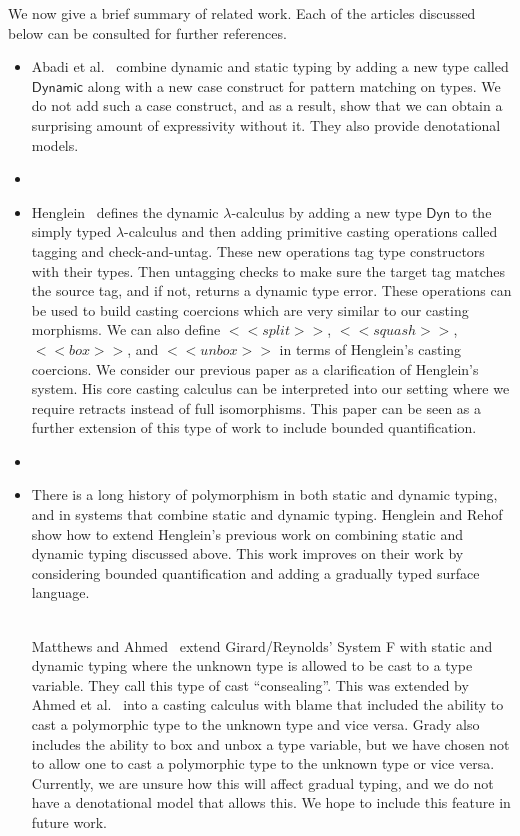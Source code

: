 We now give a brief summary of related work. Each of the articles
discussed below can be consulted for further references.
\begin{itemize}
\item Abadi et al.~\cite{Abadi:1989} combine dynamic and static typing
  by adding a new type called $\mathsf{Dynamic}$ along with a new case
  construct for pattern matching on types.  We do not add such a case
  construct, and as a result, show that we can obtain a surprising
  amount of expressivity without it.  They also provide denotational
  models.
\item[]
\item Henglein~\cite{Henglein:1994} defines the dynamic
  $\lambda$-calculus by adding a new type $\mathsf{Dyn}$ to the simply
  typed $\lambda$-calculus and then adding primitive casting
  operations called tagging and check-and-untag.  These new operations
  tag type constructors with their types.  Then untagging checks to
  make sure the target tag matches the source tag, and if not, returns
  a dynamic type error.  These operations can be used to build casting
  coercions which are very similar to our casting morphisms. We can
  also define $<<split>>$, $<<squash>>$, $<<box>>$, and $<<unbox>>$ in
  terms of Henglein's casting coercions.  We consider our previous
  paper \cite{Eades:2017} as a clarification of Henglein's system.
  His core casting calculus can be interpreted into our setting where
  we require retracts instead of full isomorphisms.  This paper can be
  seen as a further extension of this type of work to include bounded
  quantification.
\item[]
\item There is a long history of polymorphism in both static and
  dynamic typing, and in systems that combine static and dynamic
  typing. Henglein and Rehof~\cite{Henglein:1995,Rehof:1995} show how
  to extend Henglein's previous work on combining static and dynamic
  typing discussed above.  This work improves on their work by
  considering bounded quantification and adding a gradually typed
  surface language.

  \ \\
  Matthews and Ahmed~\cite{Matthews:2008:PPT:1792878.1792881} extend
  Girard/Reynolds' System F with static and dynamic typing where the
  unknown type is allowed to be cast to a type variable.  They call
  this type of cast ``consealing''.  This was extended by Ahmed et
  al.~\cite{Ahmed:2011:BLA:1926385.1926409} into a casting calculus
  with blame that included the ability to cast a polymorphic type to
  the unknown type and vice versa.  Grady also includes the ability
  to box and unbox a type variable, but we have chosen not to allow
  one to cast a polymorphic type to the unknown type or vice
  versa. Currently, we are unsure how this will affect gradual typing,
  and we do not have a denotational model that allows this.  We hope
  to include this feature in future work.


\end{itemize}
